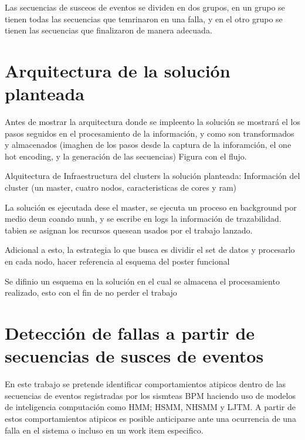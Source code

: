 Las secuencias de susceos de eventos se dividen en dos grupos, en un grupo se tienen todas las secuencias que temrinaron en una falla, y en el otro grupo se tienen las secuencias que finalizaron de manera adecuada.




\section{Arquitectura de la solución planteada} %
\label{section2.3}

Antes de mostrar la arquitectura donde se impleento la solución se mostrará el los pasos seguidos en el procesamiento de la información, y como son transformados y almacenados (imaghen de los pasos desde la captura de la inforamción, el one hot encoding, y la generación de las secuencias)
Figura con el flujo.

Alquitectura de Infraestructura del clusters la solución planteada: Información del cluster (un master, cuatro nodos, caracteristicas de cores y ram)

La solución es ejecutada dese el master, se ejecuta un proceso en background por medio deun coando nunh, y se escribe en logs la información de trazabilidad. tabien se asignan los recursos quesean usados por el trabajo lanzado. 


Adicional a esto, la estrategia lo que busca es dividir el set de datos y procesarlo en cada nodo, hacer referencia al esquema del poster funcional


Se difinio un esquema en la solución en el cual se almacena el procesamiento realizado, esto con el fin de no perder el trabajo


\section{Detección de fallas a partir de secuencias de susces de eventos} %
\label{section2.4}

En este trabajo se pretende identificar comportamientos atipicos dentro de las secuencias de eventos registradas por los sismteas BPM haciendo uso de modelos de inteligencia computación como HMM; HSMM, NHSMM y LJTM. A partir de estos comportamientos atipicos es posible anticiparse ante una ocurrencia de una falla en el sistema o incluso en un work item especifico. 


